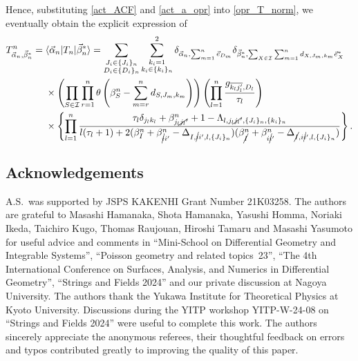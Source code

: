 \documentclass[10pt,a4paper]{amsart}
\numberwithin{equation}{section}
\begin{document}
Hence, substituting \eqref{act_ACF} and \eqref{act_a_opr} into \eqref{opr_T_norm}, we eventually obtain the explicit expression of~
\begin{align*}%
 T^{n}_{\vec{\alpha}_{n},\vec{\beta}_{n}^{\ast}}
 ={}&
\langle
 \vec{\alpha}_{n}
|
 T_{n}
|
 \vec{\beta}_{n}^{\ast}
\rangle
 =
 \sum_{
 \substack{
 J_{i}
 \in
 \{J_{i}\}_{n}
 \\
 D_{i}
 \in
 \{D_{i}\}_{n}
 }
 }
 \sum_{
 \substack{
 k_{i}
 =
 1
 \\
 k_{i}
 \in
 \{k_{i}\}_{n}
 }
 }^{2}
 \delta_{
 \vec{\alpha}_{n},
 \sum_{m=1}^{n}
 \vec{e}_{D_{m}}
 }
 \delta_{
 \vec{\beta}_{n}^{\ast},
 \sum_{
 X
 \in
 \mathcal{I}
 }
 \sum_{m=1}^{n}
 d_{
 X,
 J_{m},
 k_{m}
 }
 \vec{e}_{X}^{\ast}
 }
 \nonumber
 \\
 &
 \times
 \left(
 \prod_{
 S
 \in
 \mathcal{I}
 }
 \prod_{r=1}^{n}
 \theta
 \left(
 \beta_{S}^{n}
 -
 \sum_{m=r}^{n}
 d_{
 S,
 J_{m},
 k_{m}
 }
 \right)
 \right)
 \left(
 \prod_{l=1}^{n}
 \frac{g_{\overline{k_{l}j_{l}'},D_{l}}}{\tau_{l}}
 \right)
 \\
 &
 \times
 \left\{
 \prod_{l=1}^{n}
 \frac{
 \tau_{l}
 \delta_{j_{l}k_{l}}
 +
 \beta_{j_{l}\cancel{j_{l}}'}^{n}
 +
 1
 -
 \Lambda_{
 l,
 j_{l}\cancel{j_{l}}',
 \{
 J_{i}
 \}_{n},
 \{
 k_{i}
 \}_{n}
 }
 }{
 l
 (
 \tau_{l}+1
 )
 +
 2
 (
 \beta_{I}^{n}
 +
 \beta_{\cancel{i}i'}^{n}
 -
 \Delta_{
 I,
 \cancel{i}i',
 l,
 \{
 J_{i}
 \}_{n}
 }
 )
 (
 \beta_{\cancel{I}}^{n}
 +
 \beta_{i\cancel{i}'}^{n}
 -
 \Delta_{
 \cancel{I},
 i\cancel{i}',
 l,
 \{
 J_{i}
 \}_{n}
 }
 )
 }
 \right\}
 .
\end{align*}


\subsection*{Acknowledgements}

A.S.\ was supported by JSPS KAKENHI Grant Number 21K03258. The authors are grateful to Masashi Hamanaka, Shota Hamanaka, Yasushi Homma, Noriaki Ikeda, Taichiro Kugo, Thomas Raujouan, Hiroshi Tamaru and Masashi Yasumoto for useful advice and comments in ``Mini-School on Differential Geometry and Integrable Systems'', ``Poisson geometry and related topics~23'', ``The 4th International Conference on Surfaces, Analysis, and Numerics in Differential Geometry'', ``Strings and Fields 2024'' and our private discussion at Nagoya University. The authors thank the Yukawa Institute for Theoretical Physics at Kyoto University. Discussions during the YITP workshop YITP-W-24-08 on ``Strings and Fields 2024'' were useful to complete this work. The authors sincerely appreciate the anonymous referees, their thoughtful feedback on errors and typos contributed greatly to improving the quality of this paper.
\end{document}
